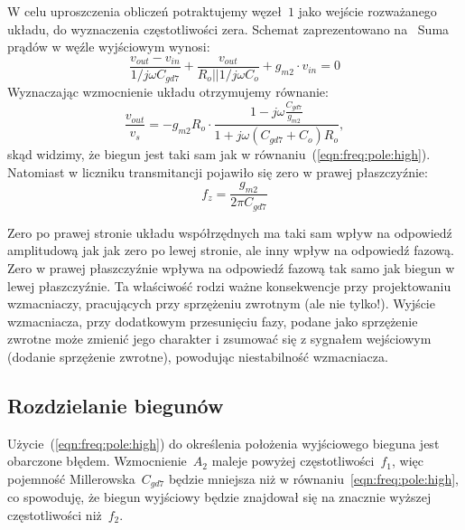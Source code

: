 \documentclass[twoside,pl,final]{labman}
\begin{document}
W celu uproszczenia obliczeń potraktujemy węzeł~$1$
jako wejście rozważanego układu, do wyznaczenia częstotliwości zera.
Schemat zaprezentowano na~
Suma prądów w węźle wyjściowym wynosi:
\begin{equation}
  \frac{v_{out} - v_{in}}{1 / j \omega C_{gd7}} +
  \frac{v_{out}}{R_o || 1 / j \omega C_o} +
  g_{m2} \cdot v_{in} = 0
\end{equation}
Wyznaczając wzmocnienie układu otrzymujemy równanie:
\begin{equation}
  \frac{v_{out}}{v_{s}} = -g_{m2} R_o \cdot
                          \frac{1 - j \omega \frac{C_{gd7}}{g_{m2}}}
                               {1 + j \omega ( C_{gd7} + C_o ) R_o},
  \label{eqn:freq:rhp:tf}
\end{equation}
skąd widzimy, że biegun jest taki sam jak w
równaniu~(\ref{eqn:freq:pole:high}).
Natomiast w liczniku transmitancji pojawiło się zero w prawej płaszczyźnie:
\begin{equation}
  f_z = \frac{g_{m2}}{2 \pi C_{gd7}}
  \label{eqn:freq:zero}
\end{equation}

Zero po prawej stronie układu współrzędnych
ma taki sam wpływ na odpowiedź amplitudową jak jak zero po lewej stronie,
ale inny wpływ na odpowiedź fazową.
Zero w prawej płaszczyźnie wpływa na odpowiedź fazową
tak samo jak biegun w lewej płaszczyźnie.
Ta właściwość rodzi ważne konsekwencje przy projektowaniu wzmacniaczy,
pracujących przy sprzężeniu zwrotnym (ale nie tylko!).
Wyjście wzmacniacza, przy dodatkowym przesunięciu fazy,
podane jako sprzężenie zwrotne może zmienić jego charakter
i zsumować się z sygnałem wejściowym
(dodanie sprzężenie zwrotne), powodując niestabilność wzmacniacza.

\subsection{Rozdzielanie biegunów}
\label{freq:split}

Użycie~(\ref{eqn:freq:pole:high}) do określenia położenia
wyjściowego bieguna jest obarczone błędem.
Wzmocnienie~$A_2$ maleje powyżej częstotliwości~$f_1$,
więc pojemność Millerowska~$C_{gd7}$ będzie mniejsza
niż w równaniu~\ref{eqn:freq:pole:high},
co spowoduję, że biegun wyjściowy będzie znajdował się
na znacznie wyższej częstotliwości niż~$f_2$.
\end{document}
